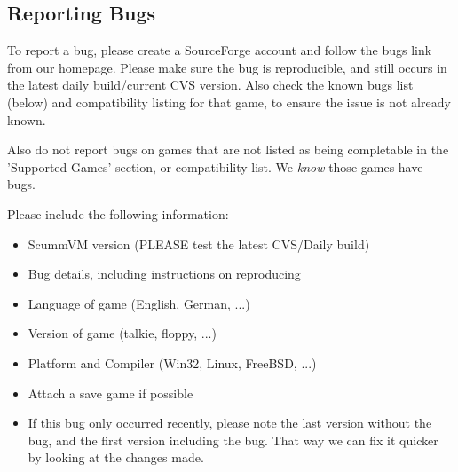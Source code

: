 \subsection{Reporting Bugs} \label{sect-reporting-bugs}

To report a bug, please create a SourceForge account and follow the bugs
link from our homepage. Please make sure the bug is reproducible, and
still occurs in the latest daily build/current CVS version. Also check
the known bugs list (below) and compatibility listing for that game, to
ensure the issue is not already known.

Also do not report bugs on games that are not listed as being completable
in the 'Supported Games' section, or compatibility list. We \textit{know} those
games have bugs.

Please include the following information:
\begin{itemize}
\item ScummVM version (PLEASE test the latest CVS/Daily build)
\item Bug details, including instructions on reproducing
\item Language of game (English, German, ...)
\item Version of game (talkie, floppy, ...)
\item Platform and Compiler (Win32, Linux, FreeBSD, ...)
\item Attach a save game if possible
\item If this bug only occurred recently, please note the last
          version without the bug, and the first version including
          the bug. That way we can fix it quicker by looking at the
          changes made.
\end{itemize}
